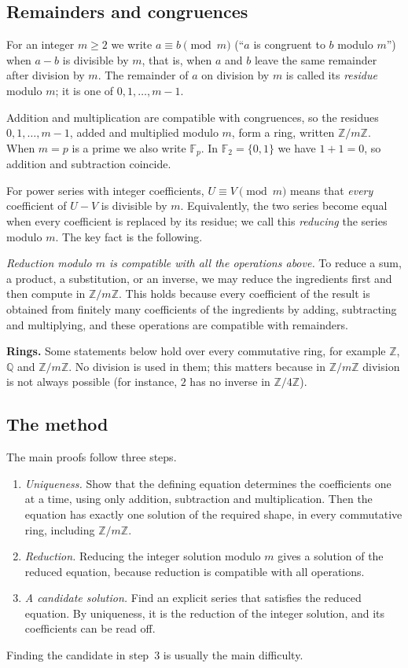 \documentclass[11pt,a4paper]{article}
\theoremstyle{definition}
\theoremstyle{remark}
\newcommand{\Z}{\mathbb{Z}}
\newcommand{\Q}{\mathbb{Q}}
\newcommand{\F}{\mathbb{F}}
\newcommand{\para}[1]{\par\medskip\noindent\textbf{#1}\enspace}
\begin{document}
\subsection{Remainders and congruences}
For an integer $m\ge2$ we write $a\equiv b\pmod m$ (``$a$ is congruent to $b$ modulo $m$'') when $a-b$ is divisible by
$m$, that is, when $a$ and $b$ leave the same remainder after division by $m$. The remainder of $a$ on division by
$m$ is called its \emph{residue} modulo $m$; it is one of $0,1,\dots,m-1$.

Addition and multiplication are compatible with congruences, so the residues $0,1,\dots,m-1$, added and multiplied
modulo $m$, form a ring, written $\Z/m\Z$. When $m=p$ is a prime we also write $\F_p$. In $\F_2=\{0,1\}$ we have $1+1=0$,
so addition and subtraction coincide.

For power series with integer coefficients, $U\equiv V\pmod m$ means that \emph{every} coefficient of $U-V$ is
divisible by $m$. Equivalently, the two series become equal when every coefficient is replaced by its residue; we call
this \emph{reducing} the series modulo $m$. The key fact is the following.

\emph{Reduction modulo $m$ is compatible with all the operations above.} To reduce a sum, a product, a substitution, or
an inverse, we may reduce the ingredients first and then compute in $\Z/m\Z$. This holds because every
coefficient of the result is obtained from finitely many coefficients of the ingredients by adding, subtracting and
multiplying, and these operations are compatible with remainders.

\para{Rings.} Some statements below hold over every commutative ring, for example $\Z$, $\Q$ and $\Z/m\Z$. No
division is used in them; this matters because in $\Z/m\Z$ division is not always possible (for instance, $2$ has no inverse in
$\Z/4\Z$).

\subsection{The method}
The main proofs follow three steps.
\begin{enumerate}
\item \emph{Uniqueness.} Show that the defining equation determines the coefficients one at a time, using only
addition, subtraction and multiplication. Then the equation has exactly one solution of the required shape, in every
commutative ring, including $\Z/m\Z$.
\item \emph{Reduction.} Reducing the integer solution modulo $m$ gives a solution of the reduced equation,
because reduction is compatible with all operations.
\item \emph{A candidate solution.} Find an explicit series that satisfies the reduced equation. By uniqueness, it is
the reduction of the integer solution, and its coefficients can be read off.
\end{enumerate}
Finding the candidate in step~3 is usually the main difficulty.
\end{document}
